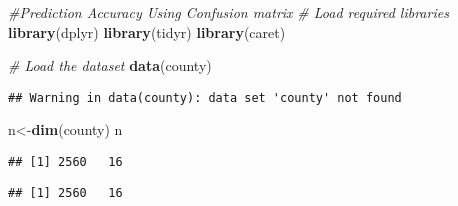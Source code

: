 \documentclass[
]{article}
\newenvironment{Shaded}{\begin{snugshade}}{\end{snugshade}}
\newcommand{\CommentTok}[1]{\textcolor[rgb]{0.56,0.35,0.01}{\textit{#1}}}
\newcommand{\DecValTok}[1]{\textcolor[rgb]{0.00,0.00,0.81}{#1}}
\newcommand{\FunctionTok}[1]{\textcolor[rgb]{0.13,0.29,0.53}{\textbf{#1}}}
\newcommand{\NormalTok}[1]{#1}
\newcommand{\OtherTok}[1]{\textcolor[rgb]{0.56,0.35,0.01}{#1}}
\newcommand{\SpecialCharTok}[1]{\textcolor[rgb]{0.81,0.36,0.00}{\textbf{#1}}}
\begin{document}
\begin{Shaded}
\begin{Highlighting}[]
\CommentTok{\#Prediction Accuracy Using Confusion matrix}
\CommentTok{\# Load required libraries}
\FunctionTok{library}\NormalTok{(dplyr)}
\FunctionTok{library}\NormalTok{(tidyr)}
\FunctionTok{library}\NormalTok{(caret)}

\CommentTok{\# Load the dataset}
\FunctionTok{data}\NormalTok{(county)}
\end{Highlighting}
\end{Shaded}

\begin{verbatim}
## Warning in data(county): data set 'county' not found
\end{verbatim}

\begin{Shaded}
\begin{Highlighting}[]
\NormalTok{n}\OtherTok{\textless{}{-}}\FunctionTok{dim}\NormalTok{(county)}
\NormalTok{n}
\end{Highlighting}
\end{Shaded}

\begin{verbatim}
## [1] 2560   16
\end{verbatim}

\begin{Shaded}
\end{Shaded}

\begin{verbatim}
## [1] 2560   16
\end{verbatim}
\end{document}
